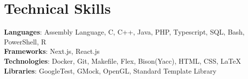\documentclass[letterpaper,11pt]{article}
\begin{document}
\section{Technical Skills}
 \begin{itemize}[leftmargin=0.15in, label={}]
    \small{\item{
     \textbf{Languages}{: Assembly Language, C, C++, Java, PHP, Typescript, SQL, Bash, PowerShell, R} \\
     \textbf{Frameworks}{: Next.js, React.js} \\
     \textbf{Technologies}{: Docker, Git, Makefile, Flex, Bison(Yacc), HTML, CSS, LaTeX } \\
     \textbf{Libraries}{: GoogleTest, GMock, OpenGL, Standard Template Library}
    }}
 \end{itemize}
\end{document}
